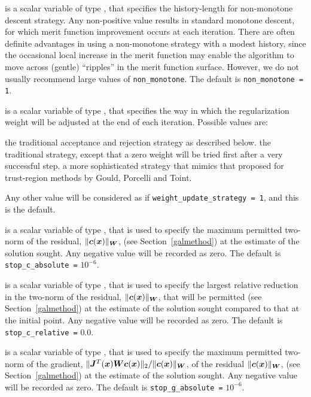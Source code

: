 \documentclass{galahad}
\begin{document}
\begin{description}
 is a scalar variable of type \integer, that
specifies the history-length for non-monotone descent strategy.
Any non-positive value results in standard monotone descent, for which
merit function improvement occurs at each iteration. There are often
definite advantages in using a non-monotone strategy with a modest history,
since the occasional local increase in the merit function may
enable the algorithm to move across (gentle) ``ripples'' in
the merit function surface.
However, we do not usually recommend large values of {\tt non\_monotone}.
The default is {\tt non\_monotone = 1}.

 is a scalar variable of type \integer,
that specifies the way in which the regularization weight will be adjusted
at the end of each iteration. Possible values are:
\begin{description}
 the traditional acceptance and rejection strategy as described below.
 the traditional strategy, except that a zero weight will be tried
first after a very successful step.
 a more sophisticated strategy that mimics that proposed
for trust-region methods by Gould, Porcelli and Toint.
\end{description}
Any other value will be considered as if {\tt weight\_update\_strategy = 1},
and this is the default.

 is a scalar variable of type \realdp,
that is used to specify the maximum permitted two-norm of the
residual, $\|{\bm{c}}({\bm{x}})\|_{{\bm{W}}}$,
(see Section~\ref{galmethod}) at the estimate of the solution sought.
Any negative value will be recorded as zero.
The default is {\tt stop\_c\_absolute =} $10^{-6}$.

 is a scalar variable of type \realdp,
that is used to specify the largest relative reduction in the two-norm of the
residual, $\|{\bm{c}}({\bm{x}})\|_{{\bm{W}}}$, that will be permitted
(see Section~\ref{galmethod}) at the estimate of the solution sought
compared to that at the initial point.
Any negative value will be recorded as zero.
The default is {\tt stop\_c\_relative =} $0.0$.

 is a scalar variable of type \realdp,
that is used to specify the maximum permitted two-norm of the gradient,
 $\|{\bm{J}}^T({\bm{x}}) {\bm{W}} {\bm{c}}({\bm{x}})\|_2/\|{\bm{c}}({\bm{x}})\|_{{\bm{W}}}$,
of the residual  $\|{\bm{c}}({\bm{x}})\|_{{\bm{W}}}$,
(see Section~\ref{galmethod}) at the estimate of the solution sought.
Any negative value will be recorded as zero.
The default is {\tt stop\_g\_absolute =} $10^{-6}$.


\end{description}
\end{document}
